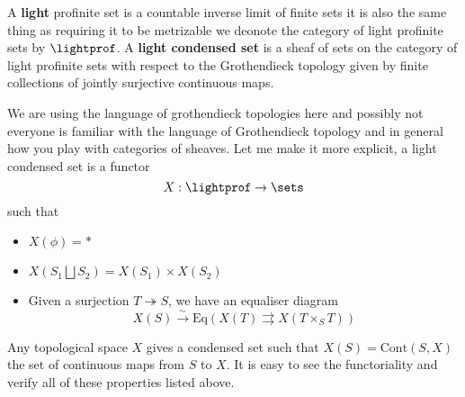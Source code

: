 \begin{definition}
    A \textbf{light} profinite set is a countable inverse limit of finite sets it is also the same thing as requiring it to be metrizable we deonote the category of light profinite sets by $\lightprof$. A \textbf{light condensed set} is a sheaf of sets on the category of light profinite sets with respect to the Grothendieck topology given by finite collections of jointly surjective continuous maps.
\end{definition}    

We are using the language of grothendieck topologies here and possibly not everyone is familiar with the language of Grothendieck topology and in  general how you play with categories of sheaves. Let me make it more explicit, a light condensed set is a functor 
$$ X : \lightprof \rightarrow \sets$$
such that 
\begin{itemize}
    \item $X(\phi) = *$
    \item $X(S_1 \bigsqcup S_2) = X(S_1) \times X(S_2)$
    \item Given a surjection $T \twoheadrightarrow S$, we have an equaliser diagram 
    $$X(S) \xrightarrow{\sim} \mathrm{Eq}(X(T) \rightrightarrows X(T \times_S T))$$
\end{itemize}


\begin{example}
    
Any topological space $X$ gives a condensed set such that $X(S) = \mathrm{Cont}(S,X)$ the set of continuous maps from $S$ to $X$. It is easy to see the functoriality and verify all of these properties listed above.
\end{example}

